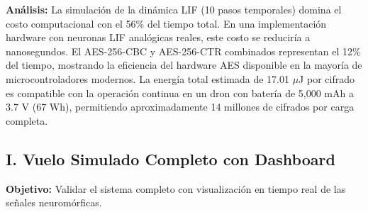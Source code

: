 \begin{table}[H]
    \centering\footnotesize\setlength{\tabcolsep}{3pt}
    \caption{Desglose computacional del cifrado multicapa}
    \label{tab:cost-breakdown}
\end{table}

\textbf{Análisis:} La simulación de la dinámica LIF (10 pasos temporales) domina el costo computacional con el 56\% del tiempo total. En una implementación hardware con neuronas LIF analógicas reales, este costo se reduciría a nanosegundos. El AES-256-CBC y AES-256-CTR combinados representan el 12\% del tiempo, mostrando la eficiencia del hardware AES disponible en la mayoría de microcontroladores modernos. La energía total estimada de 17.01 $\mu$J por cifrado es compatible con la operación continua en un dron con batería de 5,000 mAh a 3.7 V (67 Wh), permitiendo aproximadamente 14 millones de cifrados por carga completa.

\subsection*{I. Vuelo Simulado Completo con Dashboard}

\textbf{Objetivo:} Validar el sistema completo con visualización en tiempo real de las señales neuromórficas.

